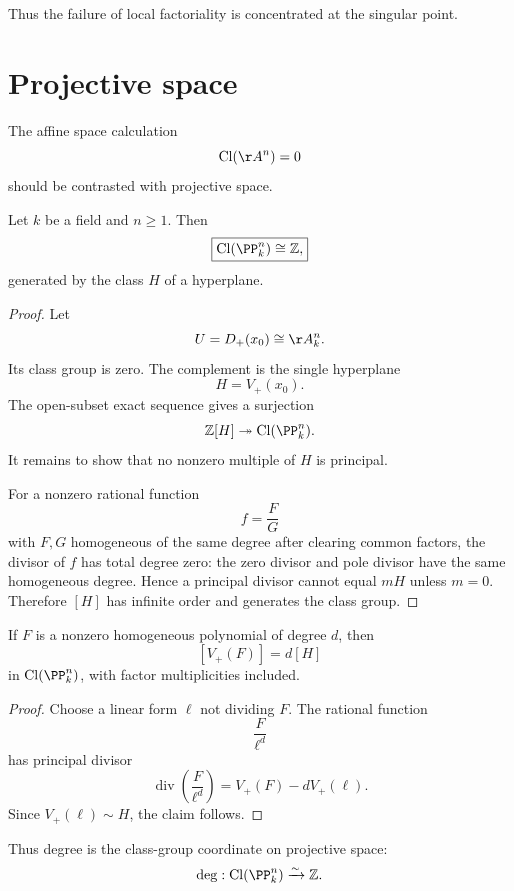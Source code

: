 Thus the failure of local factoriality is concentrated at the singular point.

\section{Projective space}

The affine space calculation
\[
  \Cl(\AA^n)=0
\]
should be contrasted with projective space.

\begin{theorem}\label{thm:vi41-projective-space}
Let \(k\) be a field and \(n\ge1\). Then
\[
  \boxed{
  \Cl(\PP^n_k)\cong\mathbb Z,
  }
\]
generated by the class \(H\) of a hyperplane.
\end{theorem}

\begin{proof}
Let
\[
  U=D_+(x_0)\cong\AA^n_k.
\]
Its class group is zero. The complement is the single hyperplane
\[
  H=V_+(x_0).
\]
The open-subset exact sequence gives a surjection
\[
  \mathbb Z[H]\twoheadrightarrow\Cl(\PP^n_k).
\]
It remains to show that no nonzero multiple of \(H\) is principal.

For a nonzero rational function
\[
  f=\frac{F}{G}
\]
with \(F,G\) homogeneous of the same degree after clearing common factors, the divisor of \(f\) has total degree zero: the zero divisor and pole divisor have the same homogeneous degree. Hence a principal divisor cannot equal \(mH\) unless \(m=0\). Therefore \([H]\) has infinite order and generates the class group.
\end{proof}



\begin{corollary}\label{cor:vi41-hypersurface-class}
If \(F\) is a nonzero homogeneous polynomial of degree \(d\), then
\[
  [V_+(F)]=d[H]
\]
in \(\Cl(\PP^n_k)\), with factor multiplicities included.
\end{corollary}

\begin{proof}
Choose a linear form \(\ell\) not dividing \(F\). The rational function
\[
  \frac{F}{\ell^d}
\]
has principal divisor
\[
  \operatorname{div}\!\left(\frac{F}{\ell^d}\right)
  =
  V_+(F)-dV_+(\ell).
\]
Since \(V_+(\ell)\sim H\), the claim follows.
\end{proof}

Thus degree is the class-group coordinate on projective space:
\[
  \deg:\Cl(\PP^n_k)\xrightarrow{\sim}\mathbb Z.
\]

